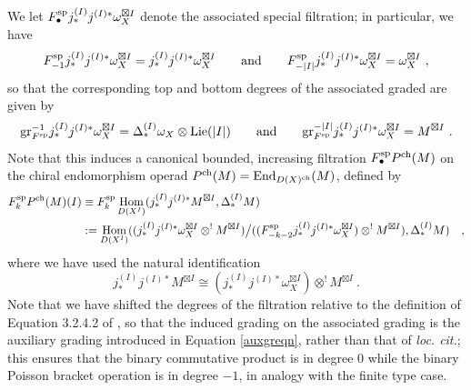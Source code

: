 \documentclass[11pt]{amsart}
\numberwithin{equation}{section}
\theoremstyle{definition}
\newcommand{\spe}{{\textup{sp}}}
\DeclareMathOperator{\Hom}{Hom}
\newcommand{\End}{{\textup{End}}}
\newcommand{\Lie}{{\textup{Lie}}}
\newcommand{\ch}{{\textup{ch}}}
\newcommand{\0}{{\textbf{0}}}
\newcommand{\DD}{{D}}
\newcommand{\gr}{\textup{gr}}
\def\ch{{\rm ch}}
\begin{document}
We let $F_\bullet^\spe j^{(I)}_*j^{(I)*}\omega_{X}^{\boxtimes I} $ denote the associated special filtration; in particular, we have
\begin{equation*}
F_{-1}^\spe j^{(I)}_*j^{(I)*}\omega_{X}^{\boxtimes I} =j^{(I)}_*j^{(I)*}\omega_{X}^{\boxtimes I}  \qquad\text{and}\qquad 	F_{-|I|}^\spe j^{(I)}_*j^{(I)*}\omega_{X}^{\boxtimes I}  = \omega_X^{\boxtimes I}   \ ,
\end{equation*}
so that the corresponding top and bottom degrees of the associated graded are given by
\begin{equation}\label{Fspegreqn}
	 \gr^{-1}_{F^\spe}j^{(I)}_*j^{(I)*}\omega_{X}^{\boxtimes I} = \Delta_*^{(I)} \omega_X \otimes \Lie(|I|)   \qquad\text{and}\qquad \gr^{-|I|}_{F^\spe}j^{(I)}_*j^{(I)*}\omega_{X}^{\boxtimes I}= M^{\boxtimes I}  \ .
\end{equation}
Note that this induces a canonical bounded, increasing filtration $F_\bullet^\spe P^\ch(M)$ on the chiral endomorphism operad $P^\ch(M)=\End_{\DD(X)^\ch}(M)$, defined by
\begin{align*}
	 F_k^\spe P^\ch(M)(I)  & \equiv  F_k^\spe \Hom_{\DD(X^I)}(j^{(I)}_*j^{(I) *}M^{\boxtimes I}, \Delta^{(I)}_*M )  \\ & := \Hom_{\DD(X^I)}((j^{(I)}_*j^{(I)*}\omega_{X}^{\boxtimes I}\otimes^! M^{\boxtimes I} )\big/ ((F_{-k-2}^\spe j^{(I)}_*j^{(I)*}\omega_{X}^{\boxtimes I}) \otimes^! M^{\boxtimes I}), \Delta^{(I)}_*M )  & ,
\end{align*}
where we have used the natural identification
\[ j^{(I)}_*j^{(I) *}M^{\boxtimes I} \cong (j^{(I)}_*j^{(I)*}\omega_{X}^{\boxtimes I}) \otimes^! M^{\boxtimes I}  \ . \]
Note that we have shifted the degrees of the filtration relative to the definition of Equation 3.2.4.2 of \cite{BD1}, so that the induced grading on the associated grading is the auxiliary grading introduced in Equation \ref{auxgreqn}, rather than that of \emph{loc. cit.}; this ensures that the binary commutative product is in degree 0 while the binary Poisson bracket operation is in degree $-1$, in analogy with the finite type case.
\end{document}
